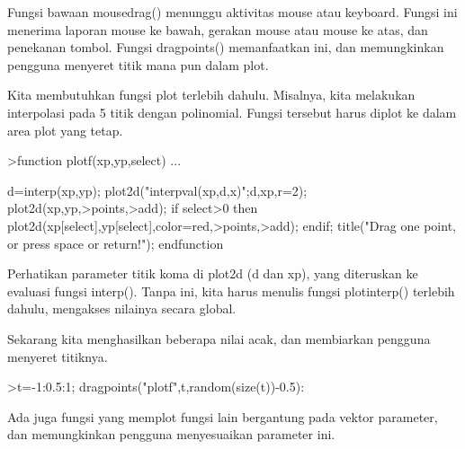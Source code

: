 \documentclass{article}
\begin{document}
\begin{eulernotebook}
\begin{eulercomment}
\begin{eulercomment}
\begin{eulercomment}
\begin{eulercomment}
\begin{eulercomment}
Fungsi bawaan mousedrag() menunggu aktivitas mouse atau keyboard.
Fungsi ini menerima laporan mouse ke bawah, gerakan mouse atau mouse
ke atas, dan penekanan tombol. Fungsi dragpoints() memanfaatkan ini,
dan memungkinkan pengguna menyeret titik mana pun dalam plot.

Kita membutuhkan fungsi plot terlebih dahulu. Misalnya, kita melakukan
interpolasi pada 5 titik dengan polinomial. Fungsi tersebut harus
diplot ke dalam area plot yang tetap.
\end{eulercomment}
\begin{eulerprompt}
>function plotf(xp,yp,select) ...
\end{eulerprompt}
\begin{eulerudf}
    d=interp(xp,yp);
    plot2d("interpval(xp,d,x)";d,xp,r=2);
    plot2d(xp,yp,>points,>add);
    if select>0 then
      plot2d(xp[select],yp[select],color=red,>points,>add);
    endif;
    title("Drag one point, or press space or return!");
  endfunction
\end{eulerudf}
\begin{eulercomment}
Perhatikan parameter titik koma di plot2d (d dan xp), yang diteruskan
ke evaluasi fungsi interp(). Tanpa ini, kita harus menulis fungsi
plotinterp() terlebih dahulu, mengakses nilainya secara global.

Sekarang kita menghasilkan beberapa nilai acak, dan membiarkan
pengguna menyeret titiknya.
\end{eulercomment}
\begin{eulerprompt}
>t=-1:0.5:1; dragpoints("plotf",t,random(size(t))-0.5):
\end{eulerprompt}
\begin{eulercomment}
Ada juga fungsi yang memplot fungsi lain bergantung pada vektor
parameter, dan memungkinkan pengguna menyesuaikan parameter ini.


\end{eulercomment}
\end{eulercomment}
\end{eulercomment}
\end{eulercomment}
\end{eulercomment}
\end{eulernotebook}
\end{document}
